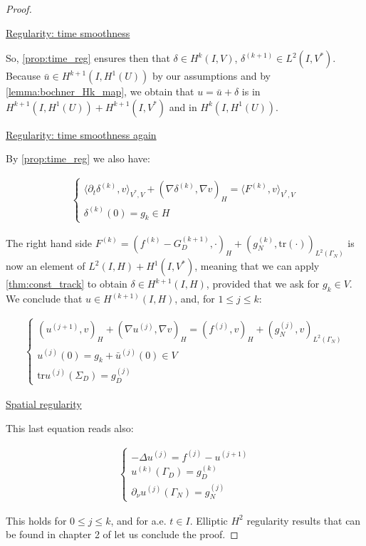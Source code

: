 \documentclass[english,a4paper,9pt,oneside]{scrbook}	%
\theoremstyle{break}
\newenvironment{mproof}[1][\proofname]{%
  \begin{proof}[#1]$ $\par\nobreak\ignorespaces
}{%
  \end{proof}
}
\renewcommand*{\proofname}{Proof}
\theoremstyle{remark}
\newcommand{\tr}{\text{tr}}
\begin{document}
\begin{appendices}
\begin{mproof}
\underline{Regularity: time smoothness}

So, \cref{prop:time_reg} ensures then that $\delta \in H^k(I,V)$, $\delta^{(k+1)} \in L^2(I,V^*)$. Because $\bar{u} \in H^{k+1}(I,H^1(U))$ by our assumptions and by \cref{lemma:bochner_Hk_map}, we obtain that $u = \bar{u} + \delta$ is in $H^{k+1}(I,H^1(U)) + H^{k+1}(I,V^*)$ and in $H^k(I,H^{1}(U))$.

\underline{Regularity: time smoothness again}

By \cref{prop:time_reg} we also have:

\begin{align*}
\left\{\begin{matrix}
\langle \partial_t \delta^{(k)},v\rangle_{V^*,V} + (\nabla \delta^{(k)}, \nabla v)_H = \langle F^{(k)}, v\rangle_{V^*,V} \\
\delta^{(k)}(0) = g_k \in H
\end{matrix}\right.
\end{align*}

The right hand side $F^{(k)} = (f^{(k)} - G^{(k+1)}_D, \cdot)_H +(g_N^{(k)}, \tr(\cdot))_{L^2(\Gamma_N)}$ is now an element of $L^2(I,H) + H^1(I,V^*)$, meaning that we can apply \cref{thm:const_track} to obtain $\delta \in H^{k+1}(I,H)$, provided that we ask for $g_k \in V$.
We conclude that $u \in H^{(k+1)}(I,H)$, and, for $1\leq j \leq k$:

\begin{align*}
	\left\{\begin{matrix}
(u^{(j+1)},v)_H + (\nabla u^{(j)}, \nabla v)_H = ( f^{(j)}, v)_H + (g_N^{(j)}, v)_{L^2(\Gamma_N)} \\
u^{(j)}(0) = g_k + \bar{u}^{(j)}(0)  \in V \\
\tr u^{(j)}(\Sigma_D) = g_D^{(j)}
\end{matrix}\right.
\end{align*}

\underline{Spatial regularity}

This last equation reads also:

\begin{align*}
\left\{\begin{matrix}
- \Delta  u^{(j)} = f^{(j)} - u^{(j+1)} \\
u^{(k)}(\Gamma_D) = g_D^{(k)} \\
\partial_\nu u^{(j)}(\Gamma_N) = g_N^{(j)}
\end{matrix}\right.
\end{align*}

This holds for $0\leq j \leq k$, and for a.e. $t \in I$.
Elliptic $H^2$ regularity results that can be found in chapter 2 of \cite{grisvard} let us conclude the proof.
\end{mproof}


\end{appendices}
\end{document}

